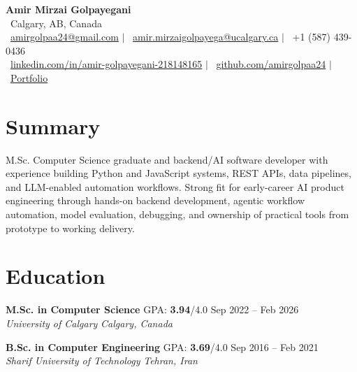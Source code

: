 \documentclass[a4paper,10pt]{article}
\newcommand{\resumeEducationSubheading}[5]{
    \textbf{#1} \hfill #2 \hfill #3 \\
    \textit{#4} \hfill \textit{#5}
}
\begin{document}

\begin{center}
    {\LARGE \textbf{Amir Mirzai Golpayegani}} \\[0.25em]
    \faMapMarker*~Calgary, AB, Canada \\[0.25em]
    \faEnvelope~\href{mailto:amirgolpaa24@gmail.com}{amirgolpaa24@gmail.com}
    $|$
    \faEnvelope~\href{mailto:amir.mirzaigolpayega@ucalgary.ca}{amir.mirzaigolpayega@ucalgary.ca}
    $|$
    \faPhone*~+1 (587) 439-0436 \\[0.25em]
    \faLinkedin~\href{https://linkedin.com/in/amir-golpayegani-218148165}{linkedin.com/in/amir-golpayegani-218148165}
    $|$
    \faGithub~\href{https://github.com/amirgolpaa24}{github.com/amirgolpaa24}
    $|$
    \faGlobe~\href{https://amir-portfolio-navy.vercel.app/}{Portfolio}
\end{center}


\section*{Summary}

M.Sc. Computer Science graduate and backend/AI software developer with experience building Python and JavaScript systems, REST APIs, data pipelines, and LLM-enabled automation workflows. Strong fit for early-career AI product engineering through hands-on backend development, agentic workflow automation, model evaluation, debugging, and ownership of practical tools from prototype to working delivery.


\section*{Education}

\resumeEducationSubheading
{M.Sc. in Computer Science}
{GPA: \textbf{3.94}/4.0}
{Sep 2022 -- Feb 2026}
{University of Calgary}
{Calgary, Canada}

\vspace{0.35em}

\resumeEducationSubheading
{B.Sc. in Computer Engineering}
{GPA: \textbf{3.69}/4.0}
{Sep 2016 -- Feb 2021}
{Sharif University of Technology}
{Tehran, Iran}

\end{document}
